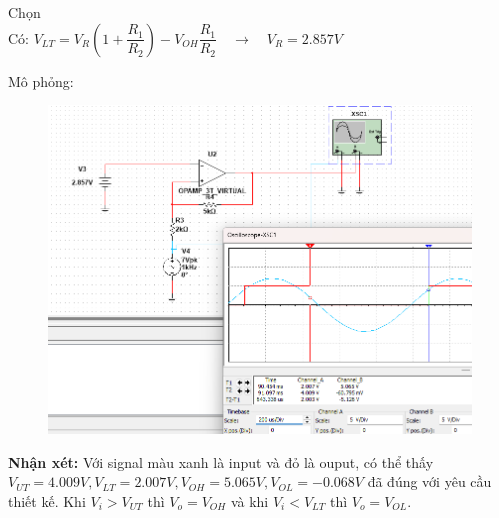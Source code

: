 Chọn
\\

Có: $V_{LT} = V_R\left(1+\dfrac{R_1}{R_2}\right) - V_{OH}\dfrac{R_1}{R_2} \quad \rightarrow \quad \boxed{V_R = 2.857V}$

Mô phỏng:
\begin{figure}[H]
	\centering
	\includegraphics[scale=0.5]{image/C11_6a.png}
\end{figure}
\textbf{Nhận xét:} Với signal màu xanh là input và đỏ là ouput, có thể thấy $V_{UT}=4.009V, V_{LT}=2.007V, V_{OH}=5.065V, V_{OL}=-0.068V$ đã đúng với yêu cầu thiết kế.
Khi $V_i>V_{UT}$ thì $V_o=V_{OH}$ và khi $V_i<V_{LT}$ thì $V_o=V_{OL}$.\\

